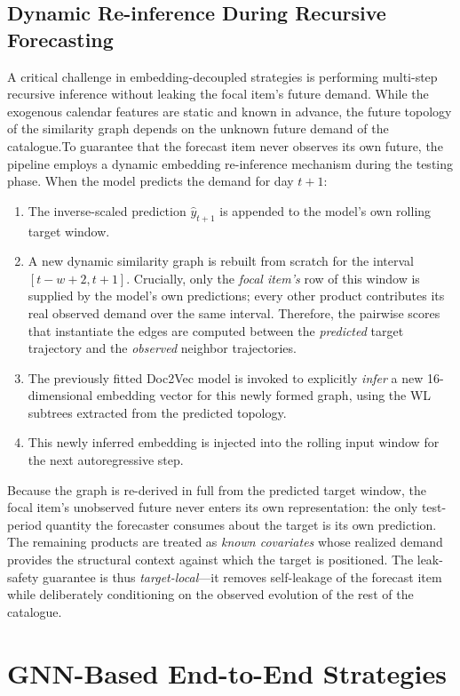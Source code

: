 \subsection{Dynamic Re-inference During Recursive Forecasting}
A critical challenge in embedding-decoupled strategies is performing multi-step recursive inference without leaking the focal item’s future demand. While the exogenous calendar features are static and known in advance, the future topology of the similarity graph depends on the unknown future demand of the catalogue.To guarantee that the forecast item never observes its own future, the pipeline employs a dynamic embedding re-inference mechanism during the testing phase. When the model predicts the demand for day $t+1$:\begin{enumerate}\item The inverse-scaled prediction $\hat{y}_{t+1}$ is appended to the model's own rolling target window. \item A new dynamic similarity graph is rebuilt from scratch for the interval $[t-w+2, t+1]$. Crucially, only the \emph{focal item's} row of this window is supplied by the model's own predictions; every other product contributes its real observed demand over the same interval. Therefore, the pairwise scores that instantiate the edges are computed between the \emph{predicted} target trajectory and the \emph{observed} neighbor trajectories. \item The previously fitted Doc2Vec model is invoked to explicitly \emph{infer} a new 16-dimensional embedding vector for this newly formed graph, using the WL subtrees extracted from the predicted topology.\item This newly inferred embedding is injected into the rolling input window for the next autoregressive step.\end{enumerate}Because the graph is re-derived in full from the predicted target window, the focal item's unobserved future never enters its own representation: the only test-period quantity the forecaster consumes about the target is its own prediction. The remaining products are treated as \emph{known covariates} whose realized demand provides the structural context against which the target is positioned. The leak-safety guarantee is thus \emph{target-local}---it removes self-leakage of the forecast item while deliberately conditioning on the observed evolution of the rest of the catalogue.


\section{GNN-Based End-to-End Strategies}

